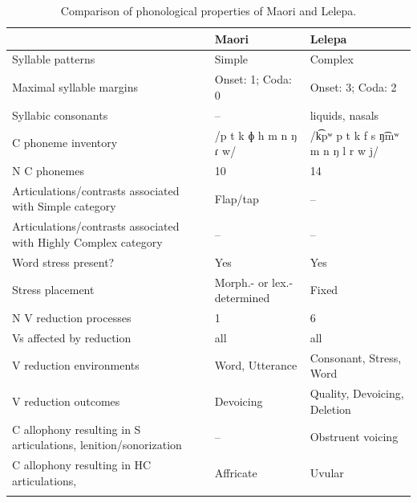 \begin{table}
\small
\begin{tabularx}{\textwidth}{QQQ}
\lsptoprule
 & {Maori} & {Lelepa}\\
 \midrule 
 {Syllable patterns} & Simple & Complex\\
\tablevspace
 {Maximal syllable margins} & Onset: 1; Coda: 0 & Onset: 3; Coda: 2\\
\tablevspace
 {Syllabic consonants} & -- & liquids, nasals\\
\tablevspace
 {C phoneme inventory} & /p t k ɸ h m n ŋ ɾ w/ & /k͡pʷ p t k f s ŋ͡mʷ m n ŋ l r w j/\\
\tablevspace
 {N C phonemes} & 10 & 14\\
\tablevspace
 {Articulations/contrasts associated with {Simple}} {category} & {Flap/tap} & {--}\\
\tablevspace
 {Articulations/contrasts associated with {Highly Complex}} {category} & {--} & {--}\\
\tablevspace
 {Word stress present?} & {Yes} & {Yes}\\
\tablevspace
 {Stress placement} & {Morph.- or lex.-determined} & {Fixed}\\
\tablevspace
 {N V reduction processes} & {1} & {6}\\
\tablevspace
 {Vs affected by reduction}  & {all} & {all}\\
\tablevspace
 {V reduction environments} & {Word, Utterance} & {Consonant, Stress, Word}\\
\tablevspace
 {V reduction outcomes} & {Devoicing} & {Quality, Devoicing, Deletion}\\
\tablevspace
 {C allophony resulting in S articulations, lenition/sonorization} & {--} & { {Obstruent voicing}}\\
\tablevspace
{ {C allophony resulting in HC articulations,} } & { {Affricate}} & {Uvular}\\
\lspbottomrule
\end{tabularx}
\caption{\label{tab:8.7}Comparison of phonological properties of Maori and Lelepa.}
\end{table}

